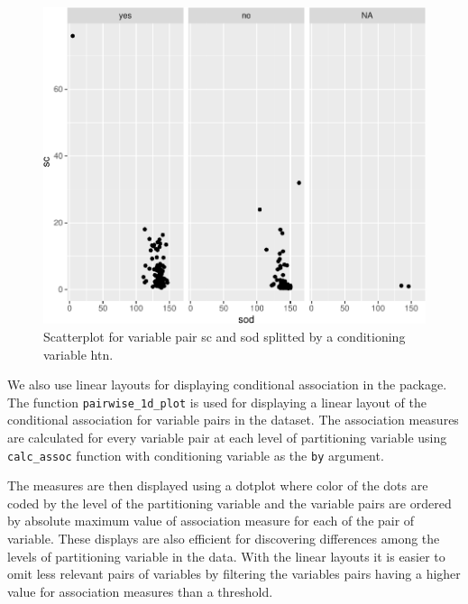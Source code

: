 \begin{Schunk}
\begin{figure}

{\centering \includegraphics{rj_paper_files/figure-latex/high_diff-1} 

}

\caption[Scatterplot for variable pair sc and sod splitted by a conditioning variable htn]{Scatterplot for variable pair sc and sod splitted by a conditioning variable htn.}\label{fig:high_diff}
\end{figure}
\end{Schunk}

We also use linear layouts for displaying conditional association in the
package. The function \texttt{pairwise\_1d\_plot} is used for displaying
a linear layout of the conditional association for variable pairs in the
dataset. The association measures are calculated for every variable pair
at each level of partitioning variable using \texttt{calc\_assoc}
function with conditioning variable as the \texttt{by} argument.

The measures are then displayed using a dotplot where color of the dots
are coded by the level of the partitioning variable and the variable
pairs are ordered by absolute maximum value of association measure for
each of the pair of variable. These displays are also efficient for
discovering differences among the levels of partitioning variable in the
data. With the linear layouts it is easier to omit less relevant pairs
of variables by filtering the variables pairs having a higher value for
association measures than a threshold.

